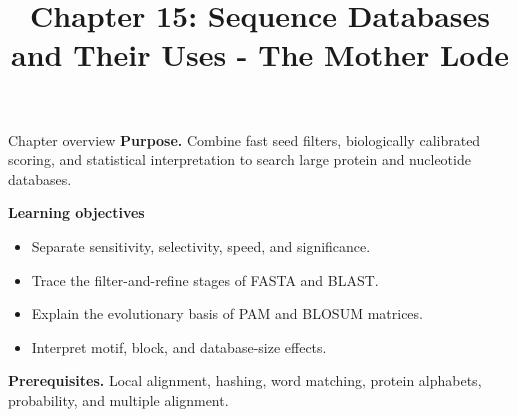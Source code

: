 \documentclass[11pt,letterpaper]{article}
\title{Chapter 15: Sequence Databases and Their Uses - The Mother Lode}
\author{}
\date{}
\begin{document}
\maketitle

\begin{CornellOverviewBox}{Chapter overview}
\textbf{Purpose.} Combine fast seed filters, biologically calibrated scoring, and statistical interpretation to search large protein and nucleotide databases.

\textbf{Learning objectives}
\begin{itemize}
  \item Separate sensitivity, selectivity, speed, and significance.
  \item Trace the filter-and-refine stages of FASTA and BLAST.
  \item Explain the evolutionary basis of PAM and BLOSUM matrices.
  \item Interpret motif, block, and database-size effects.
\end{itemize}

\textbf{Prerequisites.} Local alignment, hashing, word matching, protein alphabets, probability, and multiple alignment.
\end{CornellOverviewBox}
\end{document}
